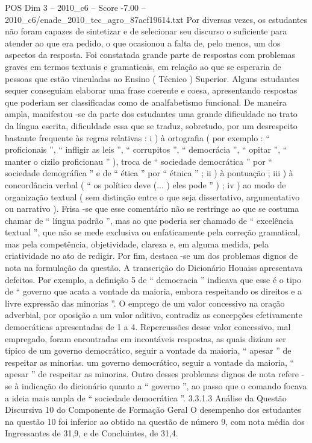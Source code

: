 \begin{textsample}{POS Dim 3 – 2010\_c6 – Score -7.00 – 2010\_c6/enade\_2010\_tec\_agro\_87acf19614.txt}
Por diversas vezes, os estudantes não foram capazes de sintetizar e de selecionar seu discurso o suficiente para atender ao que era pedido, o que ocasionou a falta de, pelo menos, um dos aspectos da resposta.
Foi constatada grande parte de respostas com problemas graves em termos textuais e gramaticais, em relação ao que se esperaria de pessoas que estão vinculadas ao Ensino ( Técnico ) Superior.
Alguns estudantes sequer conseguiam elaborar uma frase coerente e coesa, apresentando respostas que poderiam ser classificadas como de analfabetismo funcional.
De maneira ampla, manifestou -se da parte dos estudantes uma grande dificuldade no trato da língua escrita, dificuldade essa que se traduz, sobretudo, por um desrespeito bastante frequente às regras relativas : i ) à ortografia ( por exemplo : “ proficionais ”, “ infligir as leis ”, “ corrupitos ”, “ democrácia ”, “ opitar ”, “ manter o cizilo proficionau ” ), troca de “ sociedade democrática ” por “ sociedade demográfica ” e de “ ética ” por “ étnica ” ; ii ) à pontuação ; iii ) à concordância verbal ( “ os político deve (... ) eles pode ” ) ; iv ) ao modo de organização textual ( sem distinção entre o que seja dissertativo, argumentativo ou narrativo ).
Frisa -se que esse comentário não se restringe ao que se costuma chamar de “ língua padrão ”, mas ao que poderia ser chamado de “ excelência textual ”, que não se mede exclusiva ou enfaticamente pela correção gramatical, mas pela competência, objetividade, clareza e, em alguma medida, pela criatividade no ato de redigir.
Por fim, destaca -se um dos problemas dignos de nota na formulação da questão.
A transcrição do Dicionário Houaiss apresentava defeitos.
Por exemplo, a definição 5 de “ democracia ” indicava que esse é o tipo de “ governo que acata a vontade da maioria, embora respeitando os direitos e a livre expressão das minorias ”.
O emprego de um valor concessivo na oração adverbial, por oposição a um valor aditivo, contradiz as concepções efetivamente democráticas apresentadas de 1 a 4.
Repercussões desse valor concessivo, mal empregado, foram encontradas em incontáveis respostas, as quais diziam ser típico de um governo democrático, seguir a vontade da maioria, “ apesar ” de respeitar as minorias. um governo democrático, seguir a vontade da maioria, “ apesar ” de respeitar as minorias.
Outro desses problemas dignos de nota refere -se à indicação do dicionário quanto a “ governo ”, ao passo que o comando focava a ideia mais ampla de “ sociedade democrática ”. 3.3.1.3 Análise da Questão Discursiva 10 do Componente de Formação Geral O desempenho dos estudantes na questão 10 foi inferior ao obtido na questão de número 9, com nota média dos Ingressantes de 31,9, e de Concluintes, de 31,4.

\end{textsample}
